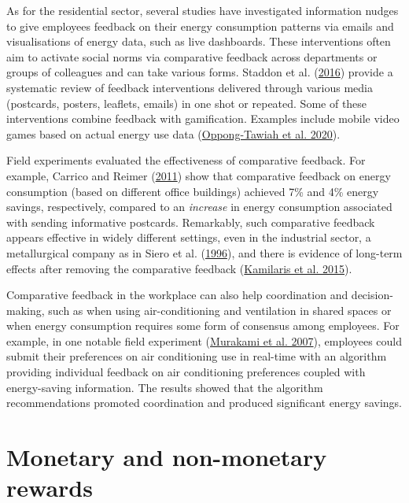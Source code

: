 \documentclass[
  12pt,
  captions=heading]{scrreport}
\begin{document}
As for the residential sector, several studies have investigated
information nudges to give employees feedback on their energy
consumption patterns via emails and visualisations of energy data, such
as live dashboards. These interventions often aim to activate social
norms via comparative feedback across departments or groups of
colleagues and can take various forms. Staddon et al.
(\protect\hyperlink{ref-staddon2016intervening}{2016}) provide a
systematic review of feedback interventions delivered through various
media (postcards, posters, leaflets, emails) in one shot or repeated.
Some of these interventions combine feedback with gamification. Examples
include mobile video games based on actual energy use data
(\protect\hyperlink{ref-oppong2020developing}{Oppong-Tawiah et al.
2020}).

Field experiments evaluated the effectiveness of comparative feedback.
For example, Carrico and Reimer
(\protect\hyperlink{ref-carrico2011motivating}{2011}) show that
comparative feedback on energy consumption (based on different office
buildings) achieved 7\% and 4\% energy savings, respectively, compared
to an \emph{increase} in energy consumption associated with sending
informative postcards. Remarkably, such comparative feedback appears
effective in widely different settings, even in the industrial sector, a
metallurgical company as in Siero et al.
(\protect\hyperlink{ref-siero1996changing}{1996}), and there is evidence
of long-term effects after removing the comparative feedback
(\protect\hyperlink{ref-kamilaris2015case}{Kamilaris et al. 2015}).

Comparative feedback in the workplace can also help coordination and
decision-making, such as when using air-conditioning and ventilation in
shared spaces or when energy consumption requires some form of consensus
among employees. For example, in one notable field experiment
(\protect\hyperlink{ref-murakami2007field}{Murakami et al. 2007}),
employees could submit their preferences on air conditioning use in
real-time with an algorithm providing individual feedback on air
conditioning preferences coupled with energy-saving information. The
results showed that the algorithm recommendations promoted coordination
and produced significant energy savings.

\hypertarget{monetary-and-non-monetary-rewards}{%
\section{Monetary and non-monetary
rewards}\label{monetary-and-non-monetary-rewards}}
\end{document}
